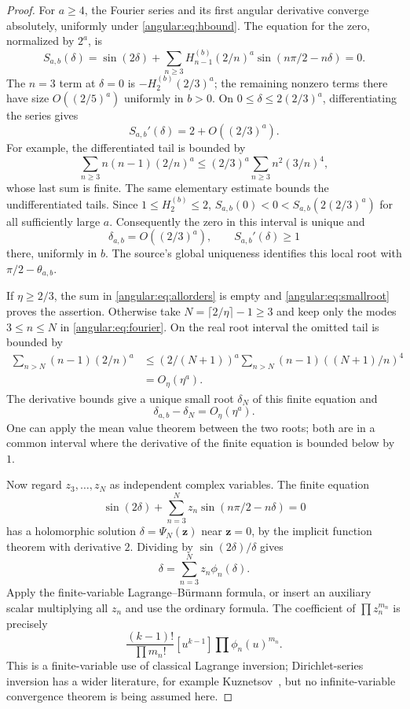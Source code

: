 \documentclass[11pt,a4paper]{article}
\theoremstyle{definition}
\theoremstyle{remark}
\numberwithin{equation}{section}
\begin{document}
\begin{proof}
For $a\geq4$, the Fourier series and its first angular derivative
converge absolutely, uniformly under \eqref{angular:eq:hbound}.
The equation for the zero, normalized by $2^a$, is
\begin{equation}\label{angular:eq:fourier}
 S_{a,b}(\delta)=\sin(2\delta)+
 \sum_{n\geq3}H_{n-1}^{(b)}(2/n)^a
      \sin(n\pi/2-n\delta)=0.
\end{equation}
The $n=3$ term at $\delta=0$ is
$-H_2^{(b)}(2/3)^a$; the remaining nonzero terms there have
size $O((2/5)^a)$ uniformly in $b>0$.  On
$0\leq\delta\leq2(2/3)^a$, differentiating the series gives
\[
 S_{a,b}'(\delta)=2+O((2/3)^a).
\]
For example, the differentiated tail is bounded by
\[
 \sum_{n\geq3}n(n-1)(2/n)^a
 \leq (2/3)^a\sum_{n\geq3}n^2(3/n)^4,
\]
whose last sum is finite. The same elementary estimate bounds the
undifferentiated tails. Since $1\leq H_2^{(b)}\leq2$,
$S_{a,b}(0)<0<S_{a,b}(2(2/3)^a)$ for all sufficiently large $a$.
Consequently the zero in this interval is unique and
\begin{equation}\label{angular:eq:smallroot}
 \delta_{a,b}=O((2/3)^a),\qquad
 S_{a,b}'(\delta)\geq1
\end{equation}
there, uniformly in $b$. The source's global uniqueness identifies
this local root with $\pi/2-\theta_{a,b}$.

If $\eta\geq2/3$, the sum in \eqref{angular:eq:allorders} is empty
and \eqref{angular:eq:smallroot} proves the assertion.  Otherwise
take $N=\lceil2/\eta\rceil-1\geq3$ and keep only the modes
$3\leq n\leq N$ in \eqref{angular:eq:fourier}. On the real root
interval the omitted tail is bounded by
\begin{align*}
 \sum_{n>N}(n-1)(2/n)^a
 &\leq (2/(N+1))^a
       \sum_{n>N}(n-1)((N+1)/n)^4\\
 &=O_\eta(\eta^a).
\end{align*}
The derivative bounds give a unique small root $\delta_N$ of this
finite equation and
\begin{equation}\label{angular:eq:finiteerror}
 \delta_{a,b}-\delta_N=O_\eta(\eta^a).
\end{equation}
One can apply the mean value theorem between the two roots; both
are in a common interval where the derivative of the finite
equation is bounded below by $1$.

Now regard $z_3,\ldots,z_N$ as independent complex variables. The
finite equation
\[
 \sin(2\delta)+\sum_{n=3}^Nz_n\sin(n\pi/2-n\delta)=0
\]
has a holomorphic solution $\delta=\Psi_N(\mathbf z)$ near
$\mathbf z=0$, by the implicit function theorem with derivative $2$.
Dividing by $\sin(2\delta)/\delta$ gives
\[
 \delta=\sum_{n=3}^Nz_n\phi_n(\delta).
\]
Apply the finite-variable Lagrange--B\"urmann formula, or insert an
auxiliary scalar multiplying all $z_n$ and use the ordinary formula.
The coefficient of $\prod z_n^{m_n}$ is precisely
\[
 \frac{(k-1)!}{\prod m_n!}
 [u^{k-1}]\prod\phi_n(u)^{m_n}.
\]
This is a finite-variable use of classical Lagrange inversion;
Dirichlet-series inversion has a wider literature, for example
Kuznetsov~\cite{Kuznetsov2019}, but no infinite-variable convergence
theorem is being assumed here.


\end{proof}
\end{document}
